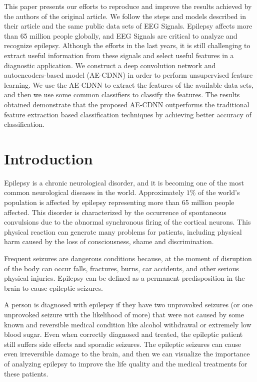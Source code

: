 
This paper presents our efforts to reproduce and improve the results achieved by the authors of the original article. We follow the steps and models described in their article and the same public data sets of EEG Signals. Epilepsy affects more than 65 million people globally, and EEG Signals are critical to analyze and recognize epilepsy. Although the efforts in the last years, it is still challenging to extract useful information from these signals and select useful features in a diagnostic application. We construct a deep convolution network and autoencoders-based model (AE-CDNN) in order to perform unsupervised feature learning. We use the AE-CDNN to extract the features of the available data sets, and then we use some common classifiers to classify the features. The results obtained demonstrate that the proposed AE-CDNN outperforms the traditional feature extraction based classification techniques by achieving better accuracy of classification.


\section{Introduction}

Epilepsy is a chronic neurological disorder, and it is becoming one of the most common neurological diseases in the world. Approximately $1\%$ of the world's population is affected by epilepsy representing more than 65 million people affected. This disorder is characterized by the occurrence of spontaneous convulsions due to the abnormal synchronous firing of the cortical neurons. This physical reaction can generate many problems for patients, including physical harm caused by the loss of consciousness, shame and discrimination.

Frequent seizures are dangerous conditions because, at the moment of disruption of the body can occur falls, fractures, burns, car accidents, and other serious physical injuries. Epilepsy can be defined as a permanent predisposition in the brain to cause epileptic seizures.

A person is diagnosed with epilepsy if they have two unprovoked seizures (or one unprovoked seizure with the likelihood of more) that were not caused by some known and reversible medical condition like alcohol withdrawal or extremely low blood sugar. Even when correctly diagnosed and treated, the epileptic patient still suffers side effects and sporadic seizures. The epileptic seizures can cause even irreversible damage to the brain, and then we can visualize the importance of analyzing epilepsy to improve the life quality and the medical treatments for these patients.

